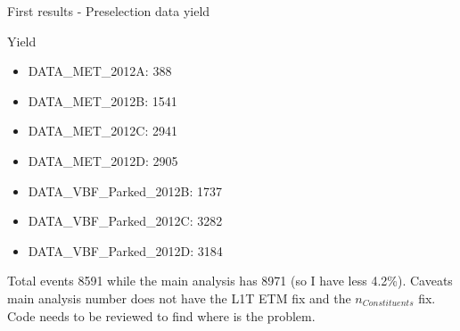 \documentclass[8pt]{beamer}
\begin{document}
\begin{frame}{First results - Preselection data yield}

\begin{block}{Yield}
 
\begin{itemize}
 \item DATA\_MET\_2012A: 388
 \item DATA\_MET\_2012B: 1541
 \item DATA\_MET\_2012C: 2941
 \item DATA\_MET\_2012D: 2905
 \item DATA\_VBF\_Parked\_2012B: 1737
 \item DATA\_VBF\_Parked\_2012C: 3282
 \item DATA\_VBF\_Parked\_2012D: 3184
\end{itemize}

Total events 8591 while the main analysis has 8971 (so I have less 4.2\%). Caveats main analysis number does not have the L1T ETM fix and the $n_{Constituents}$ fix. Code needs to be reviewed to find where is the problem.

\end{block}

\end{frame}
\end{document}
